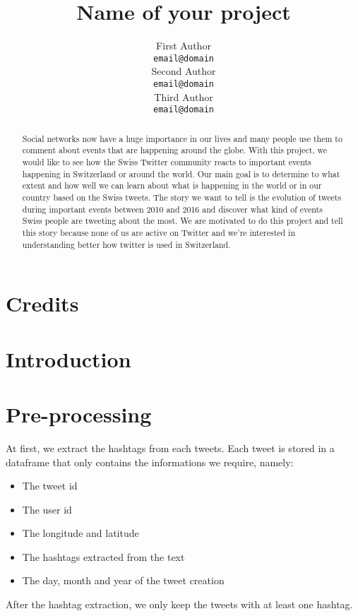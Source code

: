 \documentclass[11pt]{article}
\title{Name of your project}
\author{First Author \\
  {\tt email@domain} \\\And
  Second Author \\
  {\tt email@domain} \\\And
Third Author \\
{\tt email@domain} \\}
\date{}
\begin{document}
\maketitle
\begin{abstract}
  Social networks now have a huge importance in our lives and many people use them to comment about events that are happening around the globe. With this project, we would like to see how the Swiss Twitter community reacts to important events happening in Switzerland or around the world. Our main goal is to determine to what extent and how well we can learn about what is happening in the world or in our country based on the Swiss tweets. The story we want to tell is the evolution of tweets during important events between 2010 and 2016 and discover what kind of events Swiss people are tweeting about the most. We are motivated to do this project and tell this story because none of us are active on Twitter and we're interested in understanding better how twitter is used in Switzerland.
\end{abstract}

\section{Credits}


\section{Introduction}


\section{Pre-processing}

At first, we extract the hashtags from each tweets. Each tweet is stored in a dataframe that only contains the informations we require, namely: 
\begin{itemize}

\item The tweet id 
\item The user id
\item The longitude and latitude
\item The hashtags extracted from the text
\item The day, month and year of the tweet creation

\end{itemize}

After the hashtag extraction, we only keep the tweets with at least one hashtag.
\end{document}
